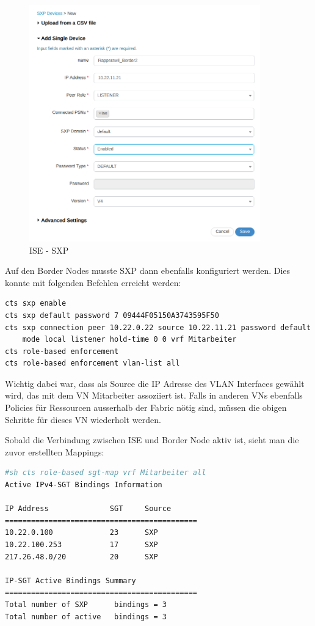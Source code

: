 \begin{figure}[H]
	\centering
	\includegraphics[width=10cm]{img/secondtry/ise-sxp.png}
	\caption{ISE - SXP}
	\label{fig:ise-sxp}
\end{figure}

Auf den Border Nodes musste SXP dann ebenfalls konfiguriert werden. Dies konnte mit folgenden Befehlen erreicht werden:
\begin{lstlisting}[language=bash]
cts sxp enable
cts sxp default password 7 09444F05150A3743595F50
cts sxp connection peer 10.22.0.22 source 10.22.11.21 password default \ 
    mode local listener hold-time 0 0 vrf Mitarbeiter
cts role-based enforcement
cts role-based enforcement vlan-list all
\end{lstlisting}
Wichtig dabei war, dass als Source die IP Adresse des VLAN Interfaces gewählt wird, das mit dem VN Mitarbeiter assoziiert ist. Falls in anderen VNs ebenfalls Policies für Ressourcen ausserhalb der Fabric nötig sind, müssen die obigen Schritte für dieses VN wiederholt werden.

Sobald die Verbindung zwischen ISE und Border Node aktiv ist, sieht man die zuvor erstellten Mappings:
\begin{lstlisting}[language=bash]
#sh cts role-based sgt-map vrf Mitarbeiter all
Active IPv4-SGT Bindings Information

IP Address              SGT     Source
============================================
10.22.0.100             23      SXP
10.22.100.253           17      SXP
217.26.48.0/20          20      SXP

IP-SGT Active Bindings Summary
============================================
Total number of SXP      bindings = 3
Total number of active   bindings = 3
\end{lstlisting}

